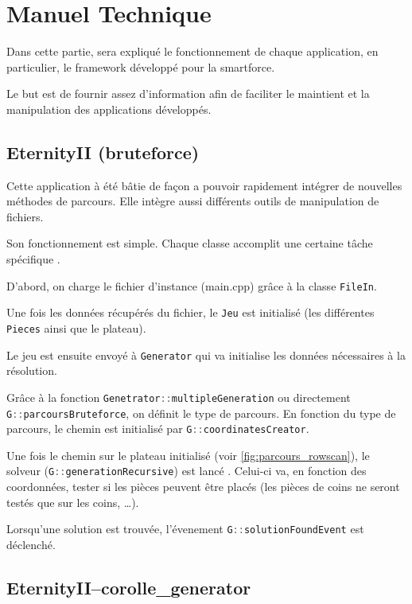 \section{Manuel Technique}

Dans cette partie, sera expliqué le fonctionnement de chaque application, en particulier, le framework développé pour la smartforce.

Le but est de fournir assez d'information afin de faciliter le maintient et la manipulation des applications développés.

	\subsection{EternityII (bruteforce)}
	
Cette application à été bâtie de façon a pouvoir rapidement intégrer de nouvelles méthodes de parcours. Elle intègre aussi différents outils de manipulation de fichiers.

Son fonctionnement est simple. Chaque classe accomplit une certaine tâche spécifique \autocite{wiki:kissprinciple}.

D'abord, on charge le fichier d'instance (main.cpp) grâce à la classe \lstinline[language=c++]|FileIn|. 

Une fois les données récupérés du fichier, le \lstinline[language=c++]|Jeu| est initialisé (les différentes \lstinline[language=c++]|Pieces| ainsi que le plateau).

Le jeu est ensuite envoyé à \lstinline[language=c++]|Generator| qui va initialise les données nécessaires à la résolution. 

Grâce à la fonction  \lstinline[language=c++]|Genetrator::multipleGeneration| ou directement  \lstinline[language=c++]|G::parcoursBruteforce|, on définit le type de parcours. En fonction du type de parcours, le chemin est initialisé par  \lstinline[language=c++]|G::coordinatesCreator|. 

Une fois le chemin sur le plateau initialisé (voir \autoref{fig:parcours_rowscan}), le solveur (\lstinline[language=c++]|G::generationRecursive|) est lancé . Celui-ci va, en fonction des coordonnées, tester si les pièces peuvent être placés (les pièces de coins ne seront testés que sur les coins, \dots). 

Lorsqu'une solution est trouvée, l'évenement \lstinline[language=c++]|G::solutionFoundEvent| est déclenché. 

	\subsection{EternityII--corolle\_generator}
	
